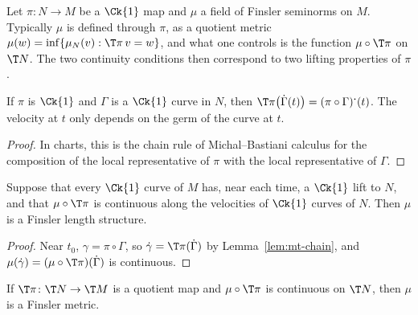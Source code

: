 Let $\pi \colon N \to M$ be a $\Ck{1}$ map and $\mu$ a field of Finsler seminorms on $M$. Typically
$\mu$ is defined through $\pi$, as a quotient metric $\mu(w) = \inf\{\mu_N(v) : \T\pi\, v = w\}$, and
what one controls is the function $\mu \circ \T\pi$ on $\T N$. The two continuity conditions then
correspond to two lifting properties of $\pi$.

\begin{lemma}
  \label{lem:mt-chain}
  \leanok
  If $\pi$ is $\Ck{1}$ and $\Gamma$ is a $\Ck{1}$ curve in $N$, then
  $\T\pi\bigl(\dot\Gamma(t)\bigr) = (\pi \circ \Gamma)^{\boldsymbol\cdot}(t)$. The velocity at $t$
  only depends on the germ of the curve at $t$.
\end{lemma}

\begin{proof}
  \leanok
  In charts, this is the chain rule of Michal--Bastiani calculus \cite{LCA} for the composition of
  the local representative of $\pi$ with the local representative of $\Gamma$.
\end{proof}

\begin{theorem}
  \label{thm:mt-lift-curves}
  \leanok
  Suppose that every $\Ck{1}$ curve of $M$ has, near each time, a $\Ck{1}$ lift to $N$, and that
  $\mu \circ \T\pi$ is continuous along the velocities of $\Ck{1}$ curves of $N$. Then $\mu$ is a
  Finsler length structure.
\end{theorem}

\begin{proof}
  \leanok
  Near $t_0$, $\gamma = \pi \circ \Gamma$, so $\dot\gamma = \T\pi(\dot\Gamma)$ by
  Lemma~\ref{lem:mt-chain}, and $\mu(\dot\gamma) = (\mu \circ \T\pi)(\dot\Gamma)$ is continuous.
\end{proof}

\begin{theorem}
  \label{thm:mt-quotient-map}
  \leanok
  If $\T\pi \colon \T N \to \T M$ is a quotient map and $\mu \circ \T\pi$ is continuous on $\T N$,
  then $\mu$ is a Finsler metric.
\end{theorem}

